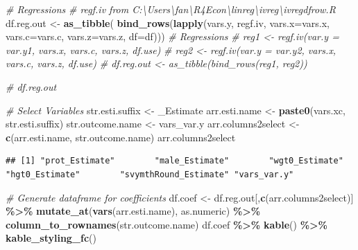 \documentclass[
]{book}
\newenvironment{Shaded}{\begin{snugshade}}{\end{snugshade}}
\newcommand{\CommentTok}[1]{\textcolor[rgb]{0.56,0.35,0.01}{\textit{#1}}}
\newcommand{\DataTypeTok}[1]{\textcolor[rgb]{0.13,0.29,0.53}{#1}}
\newcommand{\KeywordTok}[1]{\textcolor[rgb]{0.13,0.29,0.53}{\textbf{#1}}}
\newcommand{\NormalTok}[1]{#1}
\newcommand{\OperatorTok}[1]{\textcolor[rgb]{0.81,0.36,0.00}{\textbf{#1}}}
\newcommand{\StringTok}[1]{\textcolor[rgb]{0.31,0.60,0.02}{#1}}
\begin{document}
\begin{Shaded}
\begin{Highlighting}[]
\CommentTok{\# Regressions}
\CommentTok{\# regf.iv from C:\textbackslash{}Users\textbackslash{}fan\textbackslash{}R4Econ\textbackslash{}linreg\textbackslash{}ivreg\textbackslash{}ivregdfrow.R}
\NormalTok{df.reg.out \textless{}{-}}\StringTok{ }\KeywordTok{as\_tibble}\NormalTok{(}
  \KeywordTok{bind\_rows}\NormalTok{(}\KeywordTok{lapply}\NormalTok{(vars.y, regf.iv,}
                   \DataTypeTok{vars.x=}\NormalTok{vars.x, }\DataTypeTok{vars.c=}\NormalTok{vars.c, }\DataTypeTok{vars.z=}\NormalTok{vars.z, }\DataTypeTok{df=}\NormalTok{df)))}
\CommentTok{\# Regressions}
\CommentTok{\# reg1 \textless{}{-} regf.iv(var.y = var.y1, vars.x, vars.c, vars.z, df.use)}
\CommentTok{\# reg2 \textless{}{-} regf.iv(var.y = var.y2, vars.x, vars.c, vars.z, df.use)}
\CommentTok{\# df.reg.out \textless{}{-} as\_tibble(bind\_rows(reg1, reg2))}
\end{Highlighting}
\end{Shaded}

\begin{Shaded}
\begin{Highlighting}[]
\CommentTok{\# df.reg.out}
\end{Highlighting}
\end{Shaded}

\begin{Shaded}
\begin{Highlighting}[]
\CommentTok{\# Select Variables}
\NormalTok{str.esti.suffix \textless{}{-}}\StringTok{ \textquotesingle{}\_Estimate\textquotesingle{}}
\NormalTok{arr.esti.name \textless{}{-}}\StringTok{ }\KeywordTok{paste0}\NormalTok{(vars.xc, str.esti.suffix)}
\NormalTok{str.outcome.name \textless{}{-}}\StringTok{ \textquotesingle{}vars\_var.y\textquotesingle{}}
\NormalTok{arr.columns2select \textless{}{-}}\StringTok{ }\KeywordTok{c}\NormalTok{(arr.esti.name, str.outcome.name)}
\NormalTok{arr.columns2select}
\end{Highlighting}
\end{Shaded}

\begin{verbatim}
## [1] "prot_Estimate"        "male_Estimate"        "wgt0_Estimate"        "hgt0_Estimate"        "svymthRound_Estimate" "vars_var.y"
\end{verbatim}

\begin{Shaded}
\begin{Highlighting}[]
\CommentTok{\# Generate dataframe for coefficients}
\NormalTok{df.coef \textless{}{-}}\StringTok{ }\NormalTok{df.reg.out[,}\KeywordTok{c}\NormalTok{(arr.columns2select)] }\OperatorTok{\%\textgreater{}\%}
\StringTok{  }\KeywordTok{mutate\_at}\NormalTok{(}\KeywordTok{vars}\NormalTok{(arr.esti.name), as.numeric) }\OperatorTok{\%\textgreater{}\%}\StringTok{ }\KeywordTok{column\_to\_rownames}\NormalTok{(str.outcome.name)}
\NormalTok{df.coef }\OperatorTok{\%\textgreater{}\%}
\StringTok{  }\KeywordTok{kable}\NormalTok{() }\OperatorTok{\%\textgreater{}\%}
\StringTok{  }\KeywordTok{kable\_styling\_fc}\NormalTok{()}
\end{Highlighting}
\end{Shaded}
\end{document}
